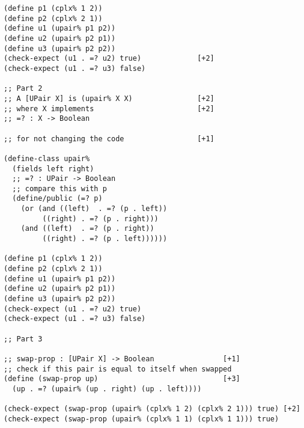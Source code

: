 \documentclass[12pt]{article}                   %
\newenvironment{solution}{}{}
\begin{document}
\begin{problem}
\begin{solution}
\begin{verbatim}
(define p1 (cplx% 1 2))
(define p2 (cplx% 2 1))
(define u1 (upair% p1 p2))
(define u2 (upair% p2 p1))
(define u3 (upair% p2 p2))
(check-expect (u1 . =? u2) true)             [+2]
(check-expect (u1 . =? u3) false)

;; Part 2
;; A [UPair X] is (upair% X X)               [+2]
;; where X implements                        [+2]
;; =? : X -> Boolean

;; for not changing the code                 [+1]

(define-class upair%
  (fields left right)
  ;; =? : UPair -> Boolean
  ;; compare this with p
  (define/public (=? p)
    (or (and ((left)  . =? (p . left))
	     ((right) . =? (p . right)))
	(and ((left)  . =? (p . right))
	     ((right) . =? (p . left))))))

(define p1 (cplx% 1 2))
(define p2 (cplx% 2 1))
(define u1 (upair% p1 p2))
(define u2 (upair% p2 p1))
(define u3 (upair% p2 p2))
(check-expect (u1 . =? u2) true)
(check-expect (u1 . =? u3) false)

;; Part 3

;; swap-prop : [UPair X] -> Boolean                [+1]
;; check if this pair is equal to itself when swapped
(define (swap-prop up)                             [+3]
  (up . =? (upair% (up . right) (up . left))))

(check-expect (swap-prop (upair% (cplx% 1 2) (cplx% 2 1))) true) [+2]
(check-expect (swap-prop (upair% (cplx% 1 1) (cplx% 1 1))) true)

\end{verbatim}
\end{solution}

\newpage
\ifrubric{}
\newpage
\fi

\end{problem}
\end{document}
